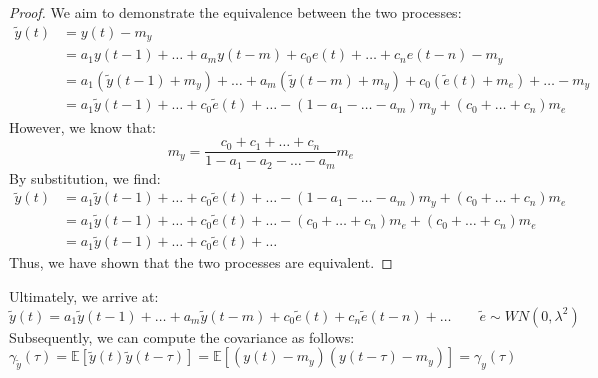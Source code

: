 \begin{proof}
    We aim to demonstrate the equivalence between the two processes:
    \begin{align*}
        \tilde{y}(t)    &= y(t)-m_y \\
                        &= a_1y(t-1)+\dots+a_m y(t-m)+c_0e(t)+\dots+c_n e(t-n) - m_y \\ 
                        &= a_1\left(\tilde{y}(t-1)+m_y\right)+\dots+a_m\left(\tilde{y}(t-m)+m_y\right)+c_0\left(\tilde{e}(t)+m_e\right)+\dots - m_y \\ 
                        &= a_1\tilde{y}(t-1) +\dots +c_0\tilde{e}(t)+\dots -\left(1 - a_1-\dots-a_m\right)m_y+\left(c_0+\dots+c_n\right)m_e   
    \end{align*}
    However, we know that:
    \[m_y =\dfrac{c_0 +c_1 +\dots+c_n}{1-a_1-a_2-\dots-a_m}m_e\]
    By substitution, we find:
    \begin{align*}
        \tilde{y}(t)    &= a_1\tilde{y}(t-1)  +\dots +c_0\tilde{e}(t)+\dots -\left(1 - a_1-\dots-a_m\right)m_y+\left(c_0+\dots+c_n\right)m_e \\ 
                        &= a_1\tilde{y}(t-1)  +\dots +c_0\tilde{e}(t)+\dots -\left(c_0 +\dots+c_n\right)m_e+\left(c_0+\dots+c_n\right)m_e \\ 
                        &= a_1\tilde{y}(t-1)  +\dots +c_0\tilde{e}(t)+\dots     
    \end{align*}
    Thus, we have shown that the two processes are equivalent.
\end{proof}
Ultimately, we arrive at:
\[ \tilde{y}(t)=a_1\tilde{y}(t-1) +\dots + a_m\tilde{y}(t-m)  +c_0\tilde{e}(t)+c_n\tilde{e}(t-n)+\dots  \qquad \tilde{e}\sim WN(0,\lambda^2)\]
Subsequently, we can compute the covariance as follows:
\[\gamma_{\tilde{y}}(\tau)=\mathbb{E}\left[ \tilde{y}(t)\tilde{y}(t-\tau) \right]=\mathbb{E}\left[ \left(y(t)-m_y\right)\left(y(t-\tau)-m_y\right) \right] =\gamma_y(\tau)\]